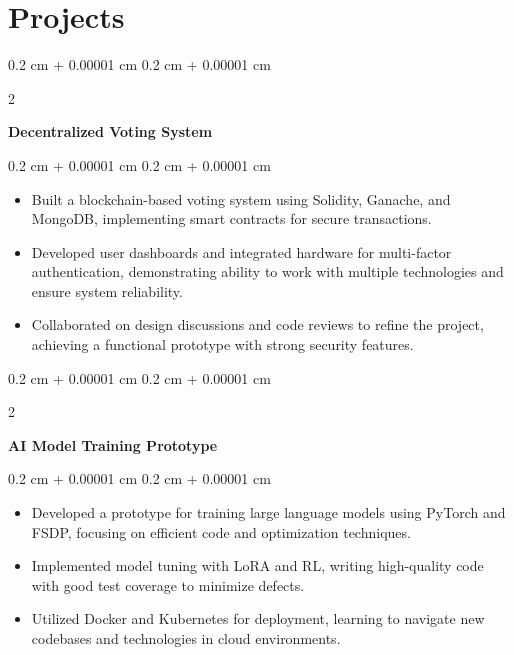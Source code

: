 \documentclass[10pt, letterpaper]{article}
\newenvironment{highlights}{
    \begin{itemize}[
        topsep=0.10 cm,
        parsep=0.10 cm,
        partopsep=0pt,
        itemsep=0pt,
        leftmargin=0.4 cm + 10pt
    ]
}{
    \end{itemize}
} %
\newenvironment{onecolentry}{
    \begin{adjustwidth}{
        0.2 cm + 0.00001 cm
    }{
        0.2 cm + 0.00001 cm
    }
}{
    \end{adjustwidth}
} %
\newenvironment{twocolentry}[2][]{
    \onecolentry
    \def\secondColumn{#2}
    \setcolumnwidth{\fill, 4.5 cm}
    \begin{paracol}{2}
}{
    \switchcolumn \raggedleft \secondColumn
    \end{paracol}
    \endonecolentry
} %
\let\hrefWithoutArrow\href
\renewcommand{\href}[2]{\hrefWithoutArrow{#1}{\ifthenelse{\equal{#2}{}}{ }{#2 }\raisebox{.15ex}{\footnotesize \faExternalLink*}}}
\begin{document}
    \section{Projects}
    \begin{twocolentry}{}
        \textbf{Decentralized Voting System} \href{https://github.com/deadhearth01/decentralized-voting-system-R307S}{\faGithub}
    \end{twocolentry}
    \vspace{0.10 cm}
    \begin{onecolentry}
        \begin{highlights}
            \item Built a blockchain-based voting system using Solidity, Ganache, and MongoDB, implementing smart contracts for secure transactions.
            \item Developed user dashboards and integrated hardware for multi-factor authentication, demonstrating ability to work with multiple technologies and ensure system reliability.
            \item Collaborated on design discussions and code reviews to refine the project, achieving a functional prototype with strong security features.
        \end{highlights}
    \end{onecolentry}
    \vspace{0.10 cm}
    \begin{twocolentry}{}
        \textbf{AI Model Training Prototype} \href{https://github.com/deadhearth01/ai-model-prototype}{\faGithub}
    \end{twocolentry}
    \vspace{0.10 cm}
    \begin{onecolentry}
        \begin{highlights}
            \item Developed a prototype for training large language models using PyTorch and FSDP, focusing on efficient code and optimization techniques.
            \item Implemented model tuning with LoRA and RL, writing high-quality code with good test coverage to minimize defects.
            \item Utilized Docker and Kubernetes for deployment, learning to navigate new codebases and technologies in cloud environments.
        \end{highlights}
    \end{onecolentry}
\end{document}
